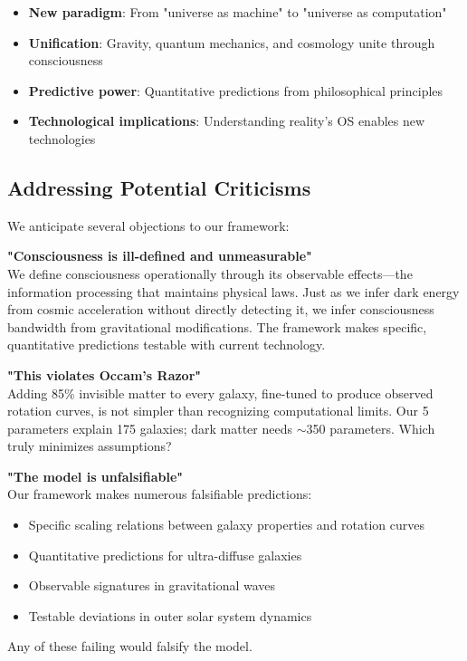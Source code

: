 \documentclass[twocolumn,prd,amsmath,amssymb,aps,superscriptaddress,nofootinbib]{revtex4-2}
\begin{document}
\begin{itemize}
\item \textbf{New paradigm}: From "universe as machine" to "universe as computation"
\item \textbf{Unification}: Gravity, quantum mechanics, and cosmology unite through consciousness
\item \textbf{Predictive power}: Quantitative predictions from philosophical principles
\item \textbf{Technological implications}: Understanding reality's OS enables new technologies
\end{itemize}

\subsection{Addressing Potential Criticisms}

We anticipate several objections to our framework:

\textbf{"Consciousness is ill-defined and unmeasurable"}\\
We define consciousness operationally through its observable effects---the information processing that maintains physical laws. Just as we infer dark energy from cosmic acceleration without directly detecting it, we infer consciousness bandwidth from gravitational modifications. The framework makes specific, quantitative predictions testable with current technology.

\textbf{"This violates Occam's Razor"}\\
Adding 85\% invisible matter to every galaxy, fine-tuned to produce observed rotation curves, is not simpler than recognizing computational limits. Our 5 parameters explain 175 galaxies; dark matter needs $\sim$350 parameters. Which truly minimizes assumptions?

\textbf{"The model is unfalsifiable"}\\
Our framework makes numerous falsifiable predictions:
\begin{itemize}
\item Specific scaling relations between galaxy properties and rotation curves
\item Quantitative predictions for ultra-diffuse galaxies
\item Observable signatures in gravitational waves
\item Testable deviations in outer solar system dynamics
\end{itemize}
Any of these failing would falsify the model.
\end{document}
